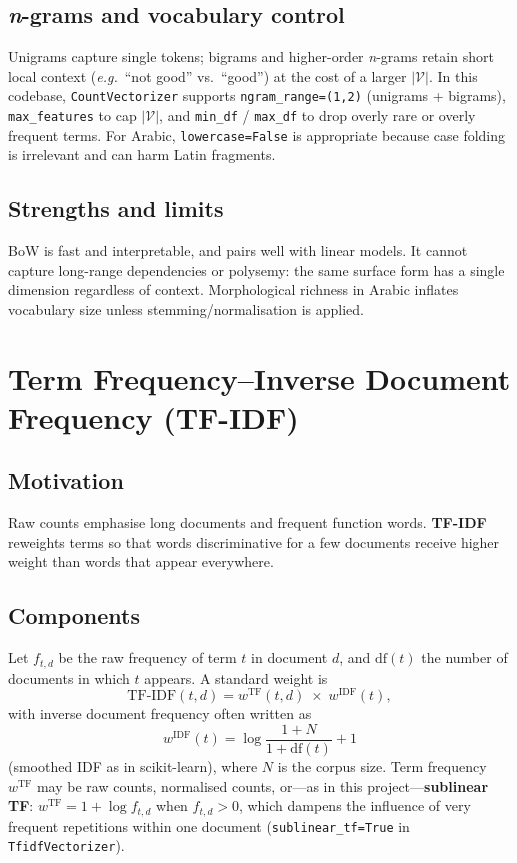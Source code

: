 \documentclass[11pt,a4paper]{report}
\begin{document}
\subsection{\textit{n}-grams and vocabulary control}
Unigrams capture single tokens; bigrams and higher-order \textit{n}-grams retain short local context (\textit{e.g.}\ ``not good'' vs.\ ``good'') at the cost of a larger $|\mathcal{V}|$. In this codebase, \texttt{CountVectorizer} supports \texttt{ngram\_range=(1,2)} (unigrams + bigrams), \texttt{max\_features} to cap $|\mathcal{V}|$, and \texttt{min\_df} / \texttt{max\_df} to drop overly rare or overly frequent terms. For Arabic, \texttt{lowercase=False} is appropriate because case folding is irrelevant and can harm Latin fragments.

\subsection{Strengths and limits}
BoW is fast and interpretable, and pairs well with linear models. It cannot capture long-range dependencies or polysemy: the same surface form has a single dimension regardless of context. Morphological richness in Arabic inflates vocabulary size unless stemming/normalisation is applied.

\section{Term Frequency--Inverse Document Frequency (TF-IDF)}

\subsection{Motivation}
Raw counts emphasise long documents and frequent function words. \textbf{TF-IDF} reweights terms so that words discriminative for a few documents receive higher weight than words that appear everywhere.

\subsection{Components}
Let $f_{t,d}$ be the raw frequency of term $t$ in document $d$, and $\mathrm{df}(t)$ the number of documents in which $t$ appears. A standard weight is
\begin{equation}
    \mathrm{TF\text{-}IDF}(t,d) = w^{\mathrm{TF}}(t,d)\;\times\;w^{\mathrm{IDF}}(t),
    \label{eq:tfidf-product}
\end{equation}
with inverse document frequency often written as
\begin{equation}
    w^{\mathrm{IDF}}(t) = \log\frac{1 + N}{1 + \mathrm{df}(t)} + 1
    \label{eq:idf-smooth}
\end{equation}
(smoothed IDF as in scikit-learn), where $N$ is the corpus size. Term frequency $w^{\mathrm{TF}}$ may be raw counts, normalised counts, or---as in this project---\textbf{sublinear TF}: $w^{\mathrm{TF}} = 1 + \log f_{t,d}$ when $f_{t,d}>0$, which dampens the influence of very frequent repetitions within one document (\texttt{sublinear\_tf=True} in \texttt{TfidfVectorizer}).
\end{document}
